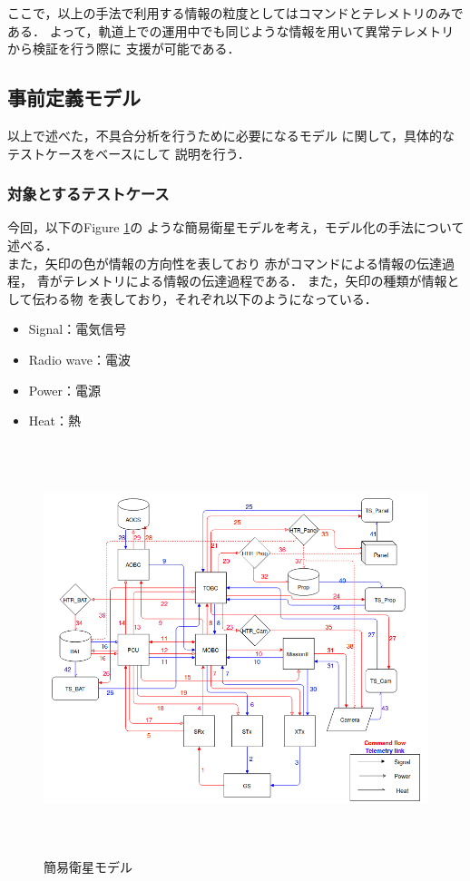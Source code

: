 \documentclass[11pt]{article}
\begin{document}
ここで，以上の手法で利用する情報の粒度としてはコマンドとテレメトリのみである．%
よって，軌道上での運用中でも同じような情報を用いて異常テレメトリから検証を行う際に
支援が可能である．

\subsection{事前定義モデル}
以上で述べた，不具合分析を行うために必要になるモデル
に関して，具体的なテストケースをベースにして
説明を行う．%

\subsubsection{対象とするテストケース}
今回，以下のFigure \ref{fig:simple_sat}の
ような簡易衛星モデルを考え，モデル化の手法について
述べる．\\
また，矢印の色が情報の方向性を表しており
赤がコマンドによる情報の伝達過程，
青がテレメトリによる情報の伝達過程である．
また，矢印の種類が情報として伝わる物
を表しており，それぞれ以下のようになっている．
\begin{itemize}
   \item Signal：電気信号
   \item Radio wave：電波
   \item Power：電源
   \item Heat：熱
\end{itemize}
\begin{figure}[H]
   \centering
      \includegraphics[height=12.0cm]{figure/satellite_diagram.PNG}
      \caption{簡易衛星モデル}
      \label{fig:simple_sat}
\end{figure}
\end{document}
